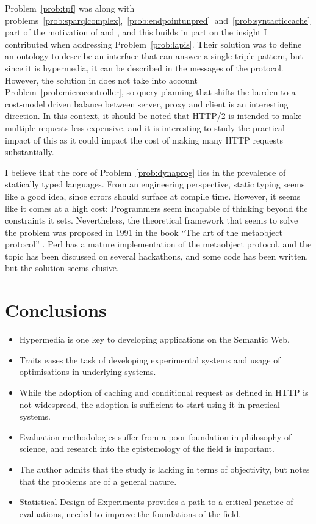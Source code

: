 Problem~\ref{prob:tpf} was along with
problems~\ref{prob:sparqlcomplex},~\ref{prob:endpointunpred}~and~\ref{prob:syntacticcache}
part of the motivation of \cite{ldf1} and \cite{verborgh2014querying},
and this builds in part on the insight I contributed when addressing
Problem~\ref{prob:lapis}. Their solution was to define an ontology to
describe an interface that can answer a single triple pattern, but
since it is hypermedia, it can be described in the messages of the
protocol. However, the solution in \cite{verborgh2014querying} does
not take into account Problem~\ref{prob:microcontroller}, so query
planning that shifts the burden to a cost-model driven balance between
server, proxy and client is an interesting direction. In this context,
it should be noted that HTTP/2 \cite{rfc7540} is intended to make
multiple requests less expensive, and it is interesting to study the
practical impact of this as it could impact the cost of making many
HTTP requests substantially.

I believe that the core of Problem~\ref{prob:dynaprog} lies in the
prevalence of statically typed languages. From an engineering
perspective, static typing seems like a good idea, since errors should
surface at compile time. However, it seems like it comes at a high
cost: Programmers seem incapable of thinking beyond the constraints it
sets. Nevertheless, the theoretical framework that seems to solve the
problem was proposed in 1991 in the book ``The art of the metaobject
protocol'' \cite{kiczales1991art}. Perl has a mature implementation of
the metaobject protocol, and the topic has been discussed on several
hackathons, and some code has been written, but the solution seems
elusive.


\section{Conclusions}\label{sec:conclusions}

\begin{itemize}
\item Hypermedia is one key to developing applications on the Semantic
  Web.
\item Traits eases the task of developing experimental systems and
  usage of optimisations in underlying systems.
\item While the adoption of caching and conditional request as defined
  in HTTP is not widespread, the adoption is sufficient to start using
  it in practical systems.
\item Evaluation methodologies suffer from a poor foundation in
  philosophy of science, and research into the epistemology of the
  field is important.
\item The author admits that the study is lacking in terms of
  objectivity, but notes that the problems are of a general nature.
\item Statistical Design of Experiments provides a path to a critical
  practice of evaluations, needed to improve the foundations of the
  field.
\end{itemize}
